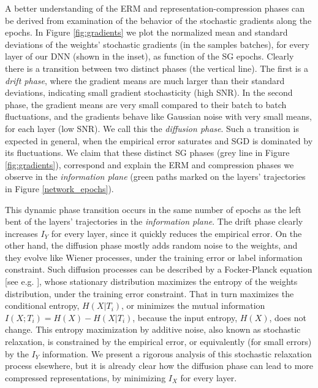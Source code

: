 \documentclass[11pt]{article}
\begin{document}
A better understanding of the ERM and representation-compression phases can be derived from examination of the behavior of the stochastic gradients along the epochs. In Figure \ref{fig:gradients} we plot the normalized mean and standard deviations of the weights' stochastic gradients (in the samples batches), for every layer of our DNN (shown in the inset), as function of the SG epochs. Clearly there is a transition between two distinct phases (the vertical line). The first is a \emph{drift phase}, where the gradient means are much larger than their standard deviations, indicating small gradient stochasticity (high SNR). In the second phase, the gradient means are very small compared to their batch to batch fluctuations, and the gradients behave like Gaussian noise with very small means, for each layer (low SNR). We call this the \emph{diffusion phase}. Such a transition is expected in general, when the empirical error saturates and SGD is dominated by its fluctuations.  
We claim that these distinct SG phases (grey line in Figure \ref{fig:gradients}), correspond and explain the ERM and compression phases we observe in the \textit{information plane} (green paths marked on the layers' trajectories in Figure \ref{network_epochs}).  

This dynamic phase transition occurs in the same number of epochs as the left bent of the layers' trajectories in the \textit{information plane}. The drift phase clearly increases $I_Y$ for every layer, since it quickly reduces the empirical error. On the other hand, the diffusion phase mostly adds random noise to the weights, and they evolve like Wiener processes, under the training error or label information constraint. Such diffusion processes can be described by a Focker-Planck equation [see e.g. \citet{risken1989fokker}], whose stationary distribution maximizes the entropy of the weights distribution, under the training error constraint.  That in turn maximizes the conditional entropy, $H(X|T_i)$, or minimizes the mutual information $I(X;T_i)=H(X)-H(X|T_i)$, because the input entropy, $H(X)$, does not change.  This entropy maximization by additive noise, also known as stochastic relaxation, is constrained by the empirical error, or equivalently (for small errors) by the $I_Y$ information.  
We present a rigorous analysis of this stochastic relaxation process elsewhere, but it is already clear how the diffusion phase can lead to more compressed representations, by minimizing $I_X$  for every layer.     
\end{document}
